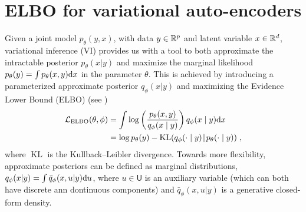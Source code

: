 \documentclass{article}
\begin{document}
\section{ELBO for variational auto-encoders}
\label{sec:extensions}

Given a joint model $p_\theta(y, x)$, with data $y \in \mathbb{R}^p$ and latent variable $x \in \mathbb{R}^d$, variational inference (VI)
provides us with a tool to both approximate the intractable
posterior $p_\theta(x|y)$ and maximize the marginal likelihood
$p_\theta(y)= \int p_\theta(x,y) \mathrm{d} x$ in the parameter $\theta$. This is achieved by introducing a
parameterized approximate posterior $q_\phi(x|y)$ and maximizing
the Evidence Lower Bound (ELBO) (see \cite{kingma2019introduction})
\begin{align}\label{eq:elbo}
\mathcal{L}_{\textup{ELBO}}(\theta,\phi)&= \int \log\left(\frac{p_\theta(x,y)}{q_\phi(x\mid y)}\right) q_\phi(x\mid y)\mathrm{d} x \;\\
&=\log p_\theta(y)-\operatorname{KL}(q_\phi(\cdot\mid y) \| p_\theta(\cdot\mid y) )\;,\nonumber
\end{align}
where $\operatorname{KL}$ is the Kullback–Leibler divergence.
Towards more flexibility, approximate posteriors can be defined as marginal distributions, $q_\phi(x|y) = \int
\bar{q}_\phi (x, u |y) \mathrm{d} u$, where $u \in \mathsf{U}$ is an auxiliary variable (which can both have discrete ann dontinuous components) and $\bar{q}_\phi(x,u|y)$ is a generative closed-form density. %
\end{document}
